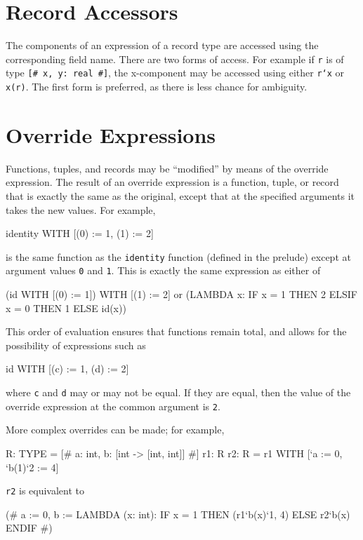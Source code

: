 \section{Record Accessors}

The components of an expression of a record type are accessed using the
corresponding field name.  There are two forms of access.  For example if
\texttt{r} is of type \texttt{[\# x, y: real \#]}, the x-component may be
accessed using either \texttt{r`x} or \texttt{x(r)}.  The first form is
preferred, as there is less chance for ambiguity.

\section{Override Expressions}

Functions, tuples, and records may be ``modified'' by means of the
override expression.  The result of an override expression is a function,
tuple, or record that is exactly the same as the original, except that at
the specified arguments it takes the new values.  For example,
\begin{pvsex}
  identity WITH [(0) := 1, (1) := 2]
\end{pvsex}
%
is the same function as the \texttt{identity} function (defined in the
prelude) except at argument values \texttt{0} and \texttt{1}.  This is exactly
the same expression as either of
\begin{pvsex}
  (id WITH [(0) := 1]) WITH [(1) := 2] {\rm or}
  (LAMBDA x: IF x = 1 THEN 2 ELSIF x = 0 THEN 1 ELSE id(x))
\end{pvsex}

This order of evaluation ensures that functions remain total, and allows
for the possibility of expressions such as
\begin{pvsex}
  id WITH [(c) := 1, (d) := 2]
\end{pvsex}
where \texttt{c} and \texttt{d} may or may not be equal.  If they are
equal, then the value of the override expression at the common argument is
\texttt{2}.

More complex overrides can be made; for example,
\begin{pvsex}
  R: TYPE = [# a: int, b: [int -> [int, int]] #]
  r1: R
  r2: R = r1 WITH [`a := 0, `b(1)`2 := 4]
\end{pvsex}
{\tt r2} is equivalent to
\begin{pvsex}
  (# a := 0,
     b := LAMBDA (x: int):
           IF x = 1
           THEN (r1`b(x)`1, 4)
           ELSE r2`b(x)
           ENDIF #)
\end{pvsex}

